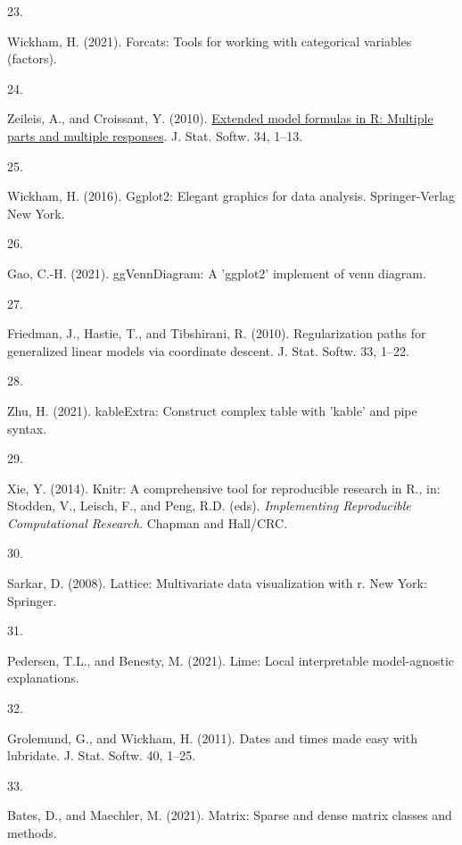 \documentclass[
]{article}
\newlength{\cslhangindent}
\newlength{\csllabelwidth}
\newlength{\cslentryspacingunit} %
\newenvironment{CSLReferences}[2] %
 {%
  \setlength{\parindent}{0pt}
  \ifodd #1
  \let\oldpar\par
  \def\par{\hangindent=\cslhangindent\oldpar}
  \fi
  \setlength{\parskip}{#2\cslentryspacingunit}
 }%
 {}
\newcommand{\CSLLeftMargin}[1]{\parbox[t]{\csllabelwidth}{#1}}
\newcommand{\CSLRightInline}[1]{\parbox[t]{\linewidth - \csllabelwidth}{#1}\break}
\begin{document}
\begin{CSLReferences}{0}{0}
\leavevmode{}%
\CSLLeftMargin{23. }
\CSLRightInline{Wickham, H. (2021). Forcats: {Tools} for working with categorical variables (factors).}

\leavevmode{}%
\CSLLeftMargin{24. }
\CSLRightInline{Zeileis, A., and Croissant, Y. (2010). \href{https://doi.org/10.18637/jss.v034.i01}{Extended model formulas in {R}: {Multiple} parts and multiple responses}. J. Stat. Softw. 34, 1--13.}

\leavevmode{}%
\CSLLeftMargin{25. }
\CSLRightInline{Wickham, H. (2016). Ggplot2: {Elegant} graphics for data analysis. {Springer-Verlag New York}.}

\leavevmode{}%
\CSLLeftMargin{26. }
\CSLRightInline{Gao, C.-H. (2021). {ggVennDiagram}: {A} 'ggplot2' implement of venn diagram.}

\leavevmode{}%
\CSLLeftMargin{27. }
\CSLRightInline{Friedman, J., Hastie, T., and Tibshirani, R. (2010). Regularization paths for generalized linear models via coordinate descent. J. Stat. Softw. 33, 1--22.}

\leavevmode{}%
\CSLLeftMargin{28. }
\CSLRightInline{Zhu, H. (2021). {kableExtra}: {Construct} complex table with 'kable' and pipe syntax.}

\leavevmode{}%
\CSLLeftMargin{29. }
\CSLRightInline{Xie, Y. (2014). Knitr: {A} comprehensive tool for reproducible research in {R}., in: Stodden, V., Leisch, F., and Peng, R.D. (eds). \emph{Implementing Reproducible Computational Research}. {Chapman and Hall/CRC}.}

\leavevmode{}%
\CSLLeftMargin{30. }
\CSLRightInline{Sarkar, D. (2008). Lattice: {Multivariate} data visualization with r. {New York}: {Springer}.}

\leavevmode{}%
\CSLLeftMargin{31. }
\CSLRightInline{Pedersen, T.L., and Benesty, M. (2021). Lime: {Local} interpretable model-agnostic explanations.}

\leavevmode{}%
\CSLLeftMargin{32. }
\CSLRightInline{Grolemund, G., and Wickham, H. (2011). Dates and times made easy with {lubridate}. J. Stat. Softw. 40, 1--25.}

\leavevmode{}%
\CSLLeftMargin{33. }
\CSLRightInline{Bates, D., and Maechler, M. (2021). Matrix: {Sparse} and dense matrix classes and methods.}


\end{CSLReferences}
\end{document}
